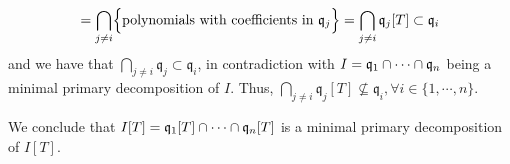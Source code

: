 \begin{problem}
\begin{enumerate}[label=(\theproblem.\arabic*),ref=\theproblem.\arabic*]
\begin{sol}
\begin{itemize}
\begin{gather*}
                    = \bigcap_{j \neq i} \Bigl\{ \text{polynomials with coefficients in } \mathfrak{q}_j \Bigr\} = \bigcap_{j \neq i} \mathfrak{q}_j[T] \subset \mathfrak{q}_i\\
                \end{gather*}
                and we have that $\bigcap_{j \neq i} \mathfrak{q}_j \subset \mathfrak{q}_i$, in contradiction with $I = \mathfrak{q}_1 \cap \cdots \cap \mathfrak{q}_n$ being a minimal primary decomposition of $I$.
                Thus, $\bigcap_{j \neq i} \mathfrak{q}_j[T] \nsubseteq \mathfrak{q}_i, \forall i \in \{ 1, \cdots, n \}$.
            \end{itemize}
            We conclude that $I[T] = \mathfrak{q}_1[T] \cap \cdots \cap \mathfrak{q}_n[T]$ is a minimal primary decomposition of $I[T]$.
        \end{sol}

    \end{enumerate}
\end{problem}